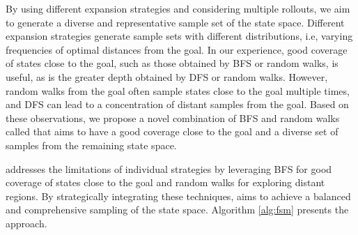 By using different expansion strategies and considering multiple rollouts, we aim to generate a diverse and representative sample set of the state space. Different expansion strategies generate sample sets with different distributions, i.e, varying frequencies of optimal distances from the goal. In our experience, good coverage of states close to the goal, such as those obtained by BFS or random walks, is useful, as is the greater depth obtained by DFS or random walks. However, random walks from the goal often sample states close to the goal multiple times, and DFS can lead to a concentration of distant samples from the goal. Based on these observations, we propose a novel combination of BFS and random walks called \bfsrw that aims to have a good coverage close to the goal and a diverse set of samples from the remaining state space.

\bfsrw addresses the limitations of individual strategies by leveraging BFS for good coverage of states close to the goal and random walks for exploring distant regions. By strategically integrating these techniques, \bfsrw aims to achieve a balanced and comprehensive sampling of the state space. Algorithm \ref{alg:fsm} presents the approach.

